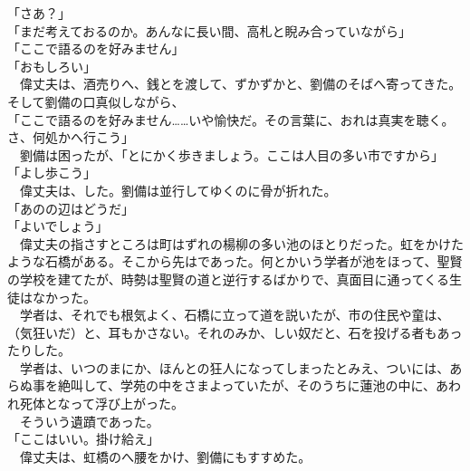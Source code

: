 \documentclass[
  paper=a5,
  fontsize=10pt,
  jafontsize=9.5pt,
  tate,                  %
  open_bracket_pos=nibu, %
]{jlreq}
\begin{document}
「さあ？」\\


「まだ考えておるのか。あんなに長い間、高札と睨み合っていながら」\\


「ここで語るのを好みません」\\


「おもしろい」\\


　偉丈夫は、酒売りへ、銭とを渡して、ずかずかと、劉備のそばへ寄ってきた。そして劉備の口真似しながら、\\


「ここで語るのを好みません……いや愉快だ。その言葉に、おれは真実を聴く。さ、何処かへ行こう」\\


　劉備は困ったが、「とにかく歩きましょう。ここは人目の多い市ですから」\\


「よし歩こう」\\


　偉丈夫は、した。劉備は並行してゆくのに骨が折れた。\\


「あのの辺はどうだ」\\


「よいでしょう」\\


　偉丈夫の指さすところは町はずれの楊柳の多い池のほとりだった。虹をかけたような石橋がある。そこから先はであった。何とかいう学者が池をほって、聖賢の学校を建てたが、時勢は聖賢の道と逆行するばかりで、真面目に通ってくる生徒はなかった。\\


　学者は、それでも根気よく、石橋に立って道を説いたが、市の住民や童は、（気狂いだ）と、耳もかさない。それのみか、しい奴だと、石を投げる者もあったりした。\\


　学者は、いつのまにか、ほんとの狂人になってしまったとみえ、ついには、あらぬ事を絶叫して、学苑の中をさまよっていたが、そのうちに蓮池の中に、あわれ死体となって浮び上がった。\\


　そういう遺蹟であった。\\


「ここはいい。掛け給え」\\


　偉丈夫は、虹橋のへ腰をかけ、劉備にもすすめた。\\
\end{document}
